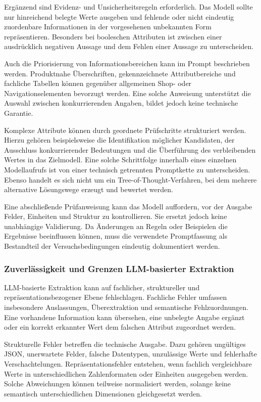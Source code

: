 Ergänzend sind Evidenz- und Unsicherheitsregeln erforderlich. Das Modell sollte nur hinreichend belegte Werte ausgeben und fehlende oder nicht eindeutig zuordenbare 
Informationen in der vorgesehenen unbekannten Form repräsentieren. Besonders bei booleschen Attributen ist zwischen einer ausdrücklich negativen Aussage und dem Fehlen 
einer Aussage zu unterscheiden.

Auch die Priorisierung von Informationsbereichen kann im Prompt beschrieben werden. Produktnahe Überschriften, gekennzeichnete Attributbereiche und fachliche Tabellen 
können gegenüber allgemeinen Shop- oder Navigationselementen bevorzugt werden. Eine solche Anweisung unterstützt die Auswahl zwischen konkurrierenden Angaben, bildet 
jedoch keine technische Garantie.

Komplexe Attribute können durch geordnete Prüfschritte strukturiert werden. Hierzu gehören beispielsweise die Identifikation möglicher Kandidaten, der Ausschluss 
konkurrierender Bedeutungen und die Überführung des verbleibenden Wertes in das Zielmodell. Eine solche Schrittfolge innerhalb eines einzelnen Modellaufrufs ist von 
einer technisch getrennten Promptkette zu unterscheiden. Ebenso handelt es sich nicht um ein Tree-of-Thought-Verfahren, bei dem mehrere alternative Lösungswege erzeugt 
und bewertet werden.

Eine abschließende Prüfanweisung kann das Modell auffordern, vor der Ausgabe Felder, Einheiten und Struktur zu kontrollieren. Sie ersetzt jedoch keine unabhängige 
Validierung. Da Änderungen an Regeln oder Beispielen die Ergebnisse beeinflussen können, muss die verwendete Promptfassung als Bestandteil der Versuchsbedingungen 
eindeutig dokumentiert werden.

\subsubsection{Zuverlässigkeit und Grenzen LLM-basierter Extraktion}

LLM-basierte Extraktion kann auf fachlicher, struktureller und repräsentationsbezogener Ebene fehlschlagen. Fachliche Fehler umfassen insbesondere Auslassungen, Überextraktion 
und semantische Fehlzuordnungen. Eine vorhandene Information kann übersehen, eine unbelegte Angabe ergänzt oder ein korrekt erkannter Wert dem falschen Attribut zugeordnet werden.

Strukturelle Fehler betreffen die technische Ausgabe. Dazu gehören ungültiges JSON, unerwartete Felder, falsche Datentypen, unzulässige Werte und fehlerhafte 
Verschachtelungen. Repräsentationsfehler entstehen, wenn fachlich vergleichbare Werte in unterschiedlichen Zahlenformaten oder Einheiten ausgegeben werden. Solche 
Abweichungen können teilweise normalisiert werden, solange keine semantisch unterschiedlichen Dimensionen gleichgesetzt werden.

